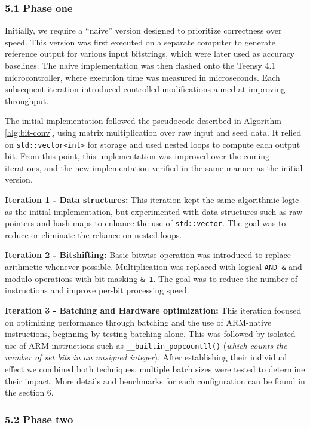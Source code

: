 \hypertarget{phase-one}{%
\subsubsection{5.1 Phase one}\label{phase-one}}

Initially, we require a ``naive'' version designed to prioritize correctness over speed. This version was first executed on a separate computer to generate reference output for various input bitstrings, which were later used as accuracy baselines. The naive implementation was then flashed onto the Teensy 4.1 microcontroller, where execution time was measured in microseconds. Each subsequent iteration introduced controlled modifications aimed at improving throughput.

The initial implementation followed the pseudocode described in Algorithm \ref{alg:bit-conv}, using matrix multiplication over raw input and seed data. It relied on \texttt{std::vector\textless{}int\textgreater{}} for storage and used nested loops to compute each output bit. From this point, this implementation was improved over the coming iterations, and the new implementation verified in the same manner as the initial version.

\textbf{Iteration 1 - Data structures:} This iteration kept the same algorithmic logic as the initial implementation, but experimented with data structures such as raw pointers and hash maps to enhance the use of \texttt{std::vector}. The goal was to reduce or eliminate the reliance on nested loops.

\textbf{Iteration 2 - Bitshifting:} Basic bitwise operation was introduced to replace arithmetic whenever possible. Multiplication was replaced with logical \texttt{AND\ \&} and modulo operations with bit masking \texttt{\&\ 1}. The goal was to reduce the number of instructions and improve per-bit processing speed.

\textbf{Iteration 3 - Batching and Hardware optimization:} This iteration focused on optimizing performance through batching and the use of ARM-native instructions, beginning by testing batching alone. This was followed by isolated use of ARM instructions such as \texttt{\_\_builtin\_popcountll()} (\emph{which counts the number of set bits in an unsigned integer}). After establishing their individual effect we combined both techniques, multiple batch sizes were tested to determine their impact. More details and benchmarks for each configuration can be found in the section 6.

\hypertarget{phase-two}{%
\subsubsection{5.2 Phase two}\label{phase-two}}

